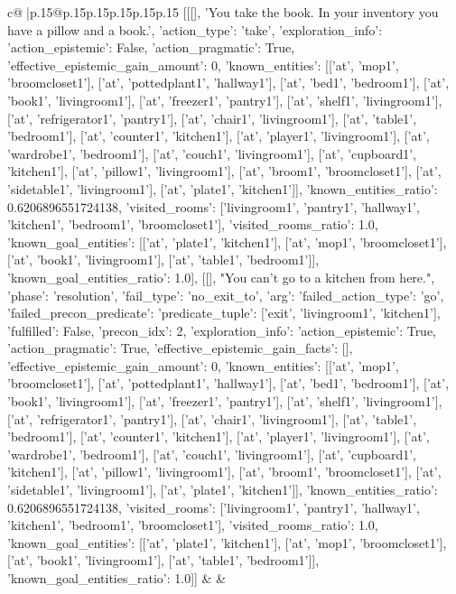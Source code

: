 \documentclass{article}
\begin{document}
{\begin{supertabular}{c@{$\;$}|p{.15\linewidth}@{}p{.15\linewidth}p{.15\linewidth}p{.15\linewidth}p{.15\linewidth}p{.15\linewidth}}
{{{	 [[[], 'You take the book. In your inventory you have a pillow and a book.', {'action_type': 'take', 'exploration_info': {'action_epistemic': False, 'action_pragmatic': True, 'effective_epistemic_gain_amount': 0, 'known_entities': [['at', 'mop1', 'broomcloset1'], ['at', 'pottedplant1', 'hallway1'], ['at', 'bed1', 'bedroom1'], ['at', 'book1', 'livingroom1'], ['at', 'freezer1', 'pantry1'], ['at', 'shelf1', 'livingroom1'], ['at', 'refrigerator1', 'pantry1'], ['at', 'chair1', 'livingroom1'], ['at', 'table1', 'bedroom1'], ['at', 'counter1', 'kitchen1'], ['at', 'player1', 'livingroom1'], ['at', 'wardrobe1', 'bedroom1'], ['at', 'couch1', 'livingroom1'], ['at', 'cupboard1', 'kitchen1'], ['at', 'pillow1', 'livingroom1'], ['at', 'broom1', 'broomcloset1'], ['at', 'sidetable1', 'livingroom1'], ['at', 'plate1', 'kitchen1']], 'known_entities_ratio': 0.6206896551724138, 'visited_rooms': ['livingroom1', 'pantry1', 'hallway1', 'kitchen1', 'bedroom1', 'broomcloset1'], 'visited_rooms_ratio': 1.0, 'known_goal_entities': [['at', 'plate1', 'kitchen1'], ['at', 'mop1', 'broomcloset1'], ['at', 'book1', 'livingroom1'], ['at', 'table1', 'bedroom1']], 'known_goal_entities_ratio': 1.0}}], [[], "You can't go to a kitchen from here.", {'phase': 'resolution', 'fail_type': 'no_exit_to', 'arg': {'failed_action_type': 'go', 'failed_precon_predicate': {'predicate_tuple': ['exit', 'livingroom1', 'kitchen1'], 'fulfilled': False, 'precon_idx': 2}}, 'exploration_info': {'action_epistemic': True, 'action_pragmatic': True, 'effective_epistemic_gain_facts': [], 'effective_epistemic_gain_amount': 0, 'known_entities': [['at', 'mop1', 'broomcloset1'], ['at', 'pottedplant1', 'hallway1'], ['at', 'bed1', 'bedroom1'], ['at', 'book1', 'livingroom1'], ['at', 'freezer1', 'pantry1'], ['at', 'shelf1', 'livingroom1'], ['at', 'refrigerator1', 'pantry1'], ['at', 'chair1', 'livingroom1'], ['at', 'table1', 'bedroom1'], ['at', 'counter1', 'kitchen1'], ['at', 'player1', 'livingroom1'], ['at', 'wardrobe1', 'bedroom1'], ['at', 'couch1', 'livingroom1'], ['at', 'cupboard1', 'kitchen1'], ['at', 'pillow1', 'livingroom1'], ['at', 'broom1', 'broomcloset1'], ['at', 'sidetable1', 'livingroom1'], ['at', 'plate1', 'kitchen1']], 'known_entities_ratio': 0.6206896551724138, 'visited_rooms': ['livingroom1', 'pantry1', 'hallway1', 'kitchen1', 'bedroom1', 'broomcloset1'], 'visited_rooms_ratio': 1.0, 'known_goal_entities': [['at', 'plate1', 'kitchen1'], ['at', 'mop1', 'broomcloset1'], ['at', 'book1', 'livingroom1'], ['at', 'table1', 'bedroom1']], 'known_goal_entities_ratio': 1.0}}]] 
	  } 
	   } 
	   } 
	 & & \\ 
 


\end{supertabular}}
\end{document}
